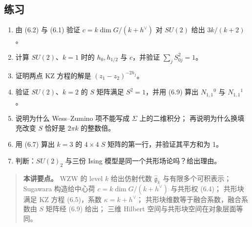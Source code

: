 \subsection*{练习}
\begin{enumerate}[leftmargin=*]
  \item 由 (6.2) 与 (6.1) 验证 $c=k\dim G/(k+h^\vee)$ 对 $SU(2)$ 给出 $3k/(k+2)$。
  \item 计算 $SU(2)$、$k=1$ 时的 $h_0,h_{1/2}$ 与 $c$，并验证 $\sum_j S_{0j}^2=1$。
  \item 证明两点 KZ 方程的解是 $(z_1-z_2)^{-2h_j}$。
  \item 验证 $SU(2)$、$k=2$ 的 $S$ 矩阵满足 $S^2=1$，并用 (6.9) 算出 $N_{1,1}{}^{0}$ 与 $N_{1,1}{}^{1}$。
  \item 说明为什么 Wess--Zumino 项不能写成 $\Sigma$ 上的二维积分；
        再说明为什么换填充改变 $S$ 恰好是 $2\pi k$ 的整数倍。
  \item 用 (6.7) 算出 $k=3$ 的 $4\times4$ $S$ 矩阵的第一行，并验证其平方和为 1。
  \item 判断：$SU(2)_2$ 与三份 Ising 模型是同一个共形场论吗？给出理由。
\end{enumerate}

\begin{quote}
\small
\textbf{本讲要点。} WZW 的 level $k$ 给出仿射代数 $\hat{\mathfrak g}_k$ 与有限多个可积表示；
Sugawara 构造给中心荷 $c=k\dim G/(k+h^\vee)$ 与共形权 (6.4)；
共形块满足 KZ 方程 (6.5)，系数 $\kappa=k+h^\vee$；
共形块维数等于融合系数，融合系数由 $S$ 矩阵经 (6.9) 给出；
三维 Hilbert 空间与共形块空间在对象层面等同。
\end{quote}

